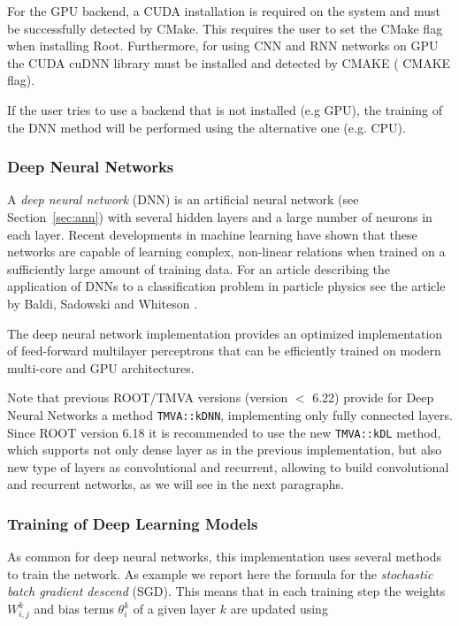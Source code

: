 For the GPU backend, a CUDA installation is required on the system and
must be successfully detected by CMake. This requires the user to set the
 CMake flag when installing Root.
Furthermore, for using CNN and RNN networks on GPU the CUDA cuDNN library
must be installed and detected by CMAKE ( CMAKE flag).  

If the user tries to use a backend that is not installed (e.g GPU), the training
of the DNN method will be performed using the alternative one (e.g. CPU). 



\subsubsection{Deep Neural Networks }
\label {sec:dnn}

A \textit{deep neural network} (DNN) is an artificial neural network
(see Section~\ref{sec:ann}) with several hidden layers and a large
number of neurons in each layer. Recent developments in machine
learning have shown that these networks are capable of learning
complex, non-linear relations when trained on a sufficiently large
amount of training data. For an article describing the application of
DNNs to a classification problem in particle physics see the article
by Baldi, Sadowski and Whiteson \cite{higgs_dnn}.

The deep neural network implementation provides
an optimized implementation of feed-forward multilayer perceptrons
that can be efficiently trained on modern multi-core and GPU
architectures.

Note that previous ROOT/TMVA versions (version $<$ 6.22) provide for Deep Neural Networks a
method {\tt TMVA::kDNN}, implementing only fully connected layers.
Since ROOT version 6.18 it is recommended to use the new {\tt TMVA::kDL} method, which supports
not only dense layer as in the previous implementation, but also new type of layers as
convolutional and recurrent, allowing to build convolutional and recurrent networks, as
we will see in the next paragraphs.




\subsubsection{Training of Deep Learning Models}
\label{sec:dnn:update}

As common for deep neural networks, this implementation uses several
methods to train the network.
As example we report here the formula for the \textit{stochastic batch gradient descend} (SGD).
This means that in each training step the weights $W^k_{i,j}$ and bias
terms $\theta_{i}^k$ of a given layer $k$ are updated using

